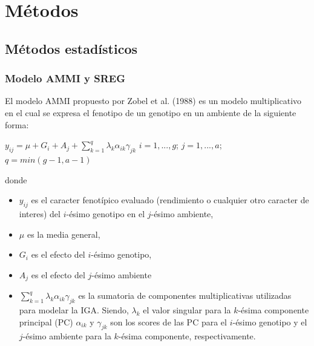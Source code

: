 
\chapter{Métodos}
\section{Métodos estadísticos}

\subsection{Modelo AMMI y SREG}

El modelo AMMI propuesto por Zobel et al. (1988) es un modelo multiplicativo en el cual se expresa el fenotipo de un genotipo en un ambiente de la siguiente forma:
\begin{center}
$y_{ij}= \mu +G_i + A_j + \sum_{k=1}^q \lambda_k \alpha_{ik} \gamma_{jk}$ \hspace{0.5cm} $ i=1,...,g$;\hspace{0.15cm} $ j=1,...,a$;\hspace{0.15cm} $q=min(g-1,a-1)$
\end{center} 
donde 
\begin{itemize}
\item $y_{ij}$ es el caracter fenotípico evaluado (rendimiento o cualquier otro caracter de interes) del $i$-ésimo genotipo en el $j$-ésimo ambiente,
\item $\mu$ es la media general,
\item  $G_i$ es el efecto del $i$-ésimo genotipo,
\item $A_j$ es el efecto del $j$-ésimo ambiente
\item $\sum_{k=1}^q \lambda_k \alpha_{ik} \gamma_{jk}$ es la sumatoria de componentes multiplicativas utilizadas para modelar la IGA. Siendo, $\lambda_k$ el valor singular para la  $k$-ésima componente principal (PC) $\alpha_{ik}$ y $\gamma_{jk}$ son los scores de las PC para el $i$-ésimo genotipo y el $j$-ésimo ambiente para la $k$-ésima componente, respectivamente.
\end{itemize}

